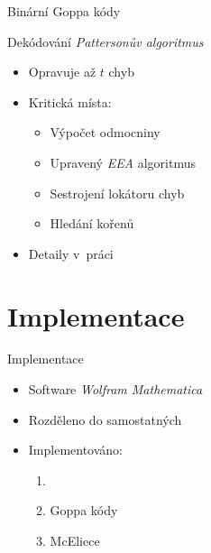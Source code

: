 \documentclass{beamer}
\begin{document}
\begin{frame}{Binární Goppa kódy}

    \begin{block}{Dekódování}
        \pause
        \emph{Pattersonův algoritmus}~\cite{Patterson}

            \pause
        \begin{itemize}
            \item Opravuje až $t$ chyb
            \item Kritická místa:
                \begin{itemize}
                    \item Výpočet odmocniny
                    \item Upravený \emph{EEA} algoritmus
                    \item Sestrojení lokátoru chyb
                    \item Hledání kořenů
                \end{itemize}

                \pause
            \item Detaily v~práci
        \end{itemize}

    \end{block}

\end{frame}


\section{Implementace}

\begin{frame}{Implementace}

    \begin{itemize}
        \item Software \emph{Wolfram Mathematica}
        \item Rozděleno do samostatných 

            \pause
        \item Implementováno:
            \begin{enumerate}
                \item {}
                \item Goppa kódy
                \item McEliece
            \end{enumerate}
    \end{itemize}

\end{frame}
\end{document}
